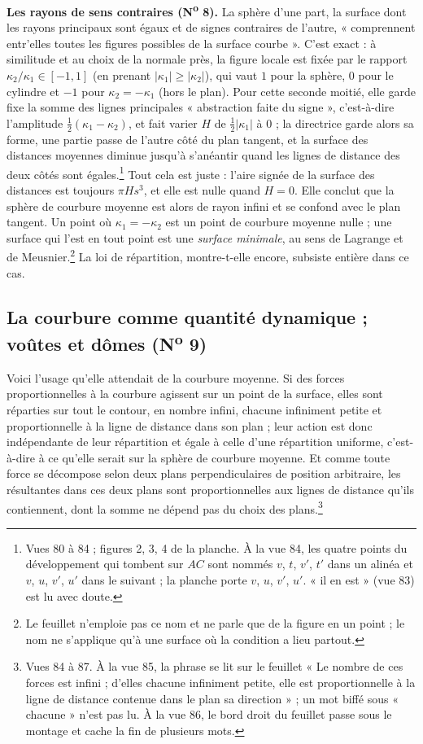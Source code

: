 \documentclass[11pt,a4paper]{article}
\begin{document}
\textbf{Les rayons de sens contraires (N\textsuperscript{o} 8).} La sphère d'une
part, la surface dont les rayons principaux sont égaux et de signes contraires de
l'autre, « comprennent entr'elles toutes les figures possibles de la surface
courbe ». C'est exact : à similitude et au choix de la normale près, la figure
locale est fixée par le rapport $\kappa_2/\kappa_1 \in [-1, 1]$ (en prenant
$|\kappa_1| \ge |\kappa_2|$), qui vaut $1$ pour la sphère, $0$ pour le cylindre et
$-1$ pour $\kappa_2 = -\kappa_1$ (hors le plan). Pour cette seconde moitié, elle
garde fixe la somme des lignes principales « abstraction faite du signe »,
c'est-à-dire l'amplitude $\frac12(\kappa_1 - \kappa_2)$, et fait varier $H$ de
$\frac12|\kappa_1|$ à $0$ ; la directrice garde alors sa forme, une partie passe
de l'autre côté du plan tangent, et la surface des distances moyennes diminue
jusqu'à s'anéantir quand les lignes de distance des deux côtés sont
égales.\footnote{Vues 80 à 84 ; figures 2, 3, 4 de la planche. À la vue 84, les
quatre points du développement qui tombent sur $AC$ sont nommés $v$, $t$, $v'$,
$t'$ dans un alinéa et $v$, $u$, $v'$, $u'$ dans le suivant ; la planche porte
$v$, $u$, $v'$, $u'$. « il en est » (vue 83) est lu avec doute.} Tout cela est
juste : l'aire signée de la surface des distances est toujours $\pi H s^3$, et
elle est nulle quand $H = 0$. Elle conclut que la sphère de courbure moyenne est
alors de rayon infini et se confond avec le plan tangent. Un point où
$\kappa_1 = -\kappa_2$ est un point de courbure moyenne nulle ; une surface qui
l'est en tout point est une \emph{surface minimale}, au sens de Lagrange et de
Meusnier.\footnote{Le feuillet n'emploie pas ce nom et ne parle que de la figure
en un point ; le nom ne s'applique qu'à une surface où la condition a lieu
partout.} La loi de répartition, montre-t-elle encore, subsiste entière dans ce
cas.

\subsection*{La courbure comme quantité dynamique ; voûtes et dômes (N\textsuperscript{o} 9)}

Voici l'usage qu'elle attendait de la courbure moyenne. Si des forces
proportionnelles à la courbure agissent sur un point de la surface, elles sont
réparties sur tout le contour, en nombre infini, chacune infiniment petite et
proportionnelle à la ligne de distance dans son plan ; leur action est donc
indépendante de leur répartition et égale à celle d'une répartition uniforme,
c'est-à-dire à ce qu'elle serait sur la sphère de courbure moyenne. Et comme
toute force se décompose selon deux plans perpendiculaires de position
arbitraire, les résultantes dans ces deux plans sont proportionnelles aux lignes
de distance qu'ils contiennent, dont la somme ne dépend pas du choix des
plans.\footnote{Vues 84 à 87. À la vue 85, la phrase se lit sur le feuillet « Le
nombre de ces forces est infini ; d'elles chacune infiniment petite, elle est
proportionnelle à la ligne de distance contenue dans le plan sa direction » ; un
mot biffé sous « chacune » n'est pas lu. À la vue 86, le bord droit du feuillet
passe sous le montage et cache la fin de plusieurs mots.}
\end{document}
